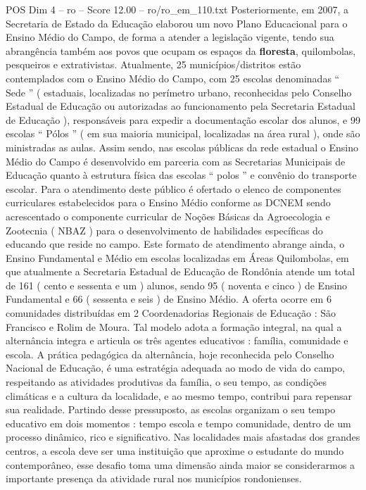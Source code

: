 \begin{textsample}{POS Dim 4 – ro – Score 12.00 – ro/ro\_em\_110.txt}
Posteriormente, em 2007, a Secretaria de Estado da Educação elaborou um novo Plano Educacional para o Ensino Médio do Campo, de forma a atender a legislação vigente, tendo sua abrangência também aos povos que ocupam os espaços da \textbf{floresta}, quilombolas, pesqueiros e extrativistas.
Atualmente, 25 municípios/distritos estão contemplados com o Ensino Médio do Campo, com 25 escolas denominadas “ Sede ” ( estaduais, localizadas no perímetro urbano, reconhecidas pelo Conselho Estadual de Educação ou autorizadas ao funcionamento pela Secretaria Estadual de Educação ), responsáveis para expedir a documentação escolar dos alunos, e 99 escolas “ Pólos ” ( em sua maioria municipal, localizadas na área rural ), onde são ministradas as aulas.
Assim sendo, nas escolas públicas da rede estadual o Ensino Médio do Campo é desenvolvido em parceria com as Secretarias Municipais de Educação quanto à estrutura física das escolas “ polos ” e convênio do transporte escolar.
Para o atendimento deste público é ofertado o elenco de componentes curriculares estabelecidos para o Ensino Médio conforme as DCNEM sendo acrescentado o componente curricular de Noções Básicas da Agroecologia e Zootecnia ( NBAZ ) para o desenvolvimento de habilidades específicas do educando que reside no campo.
Este formato de atendimento abrange ainda, o Ensino Fundamental e Médio em escolas localizadas em Áreas Quilombolas, em que atualmente a Secretaria Estadual de Educação de Rondônia atende um total de 161 ( cento e sessenta e um ) alunos, sendo 95 ( noventa e cinco ) de Ensino Fundamental e 66 ( sessenta e seis ) de Ensino Médio.
A oferta ocorre em 6 comunidades distribuídas em 2 Coordenadorias Regionais de Educação : São Francisco e Rolim de Moura.
Tal modelo adota a formação integral, na qual a alternância integra e articula os três agentes educativos : família, comunidade e escola.
A prática pedagógica da alternância, hoje reconhecida pelo Conselho Nacional de Educação, é uma estratégia adequada ao modo de vida do campo, respeitando as atividades produtivas da família, o seu tempo, as condições climáticas e a cultura da localidade, e ao mesmo tempo, contribui para repensar sua realidade.
Partindo desse pressuposto, as escolas organizam o seu tempo educativo em dois momentos : tempo escola e tempo comunidade, dentro de um processo dinâmico, rico e significativo.
Nas localidades mais afastadas dos grandes centros, a escola deve ser uma instituição que aproxime o estudante do mundo contemporâneo, esse desafio toma uma dimensão ainda maior se considerarmos a importante presença da atividade rural nos municípios rondonienses.

\end{textsample}
